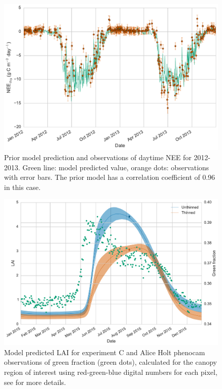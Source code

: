  
 \begin{figure}[ht]
 \noindent\includegraphics[width=40pc]{chapter/chapter7/prior.pdf}
    \caption{Prior model prediction and observations of daytime NEE for 2012-2013. Green line: model predicted value, orange dots: observations with error bars. The prior model has a correlation coefficient of 0.96 in this case.} 
    \label{fig:prior_mod}
\end{figure}


\begin{figure}[ht]
 \noindent\includegraphics[width=40pc]{chapter/chapter7/pheno_lai.pdf}
    \caption{Model predicted LAI for experiment C and Alice Holt phenocam observations of green fraction (green dots), calculated for the canopy region of interest using red-green-blue digital numbers for each pixel, see \citet{mizunuma2013relationship} for more details.} \label{fig:pheno_obs}
\end{figure}


